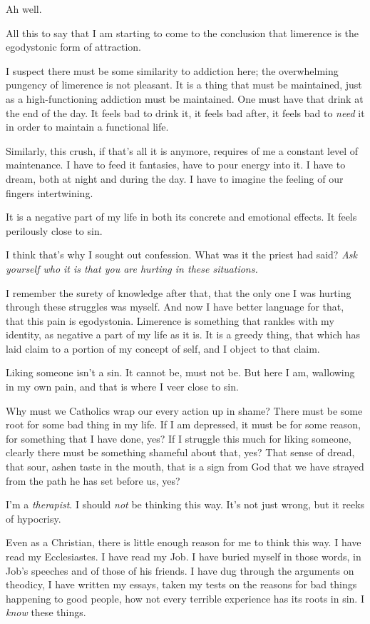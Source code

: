 Ah well.

All this to say that I am starting to come to the conclusion that limerence is the egodystonic form of attraction.

I suspect there must be some similarity to addiction here; the overwhelming pungency of limerence is not pleasant. It is a thing that must be maintained, just as a high-functioning addiction must be maintained. One must have that drink at the end of the day. It feels bad to drink it, it feels bad after, it feels bad to \emph{need} it in order to maintain a functional life.

Similarly, this crush, if that's all it is anymore, requires of me a constant level of maintenance. I have to feed it fantasies, have to pour energy into it. I have to dream, both at night and during the day. I have to imagine the feeling of our fingers intertwining.

It is a negative part of my life in both its concrete and emotional effects. It feels perilously close to sin.

I think that's why I sought out confession. What was it the priest had said? \emph{Ask yourself who it is that you are hurting in these situations.}

I remember the surety of knowledge after that, that the only one I was hurting through these struggles was myself. And now I have better language for that, that this pain is egodystonia. Limerence is something that rankles with my identity, as negative a part of my life as it is. It is a greedy thing, that which has laid claim to a portion of my concept of self, and I object to that claim.

Liking someone isn't a sin. It cannot be, must not be. But here I am, wallowing in my own pain, and that is where I veer close to sin.

Why must we Catholics wrap our every action up in shame? There must be some root for some bad thing in my life. If I am depressed, it must be for some reason, for something that I have done, yes? If I struggle this much for liking someone, clearly there must be something shameful about that, yes? That sense of dread, that sour, ashen taste in the mouth, that is a sign from God that we have strayed from the path he has set before us, yes?

I'm a \emph{therapist}. I should \emph{not} be thinking this way. It's not just wrong, but it reeks of hypocrisy.

Even as a Christian, there is little enough reason for me to think this way. I have read my Ecclesiastes. I have read my Job. I have buried myself in those words, in Job's speeches and of those of his friends. I have dug through the arguments on theodicy, I have written my essays, taken my tests on the reasons for bad things happening to good people, how not every terrible experience has its roots in sin. I \emph{know} these things.

